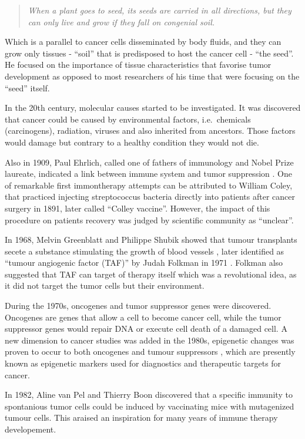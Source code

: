 \documentclass[12pt,]{book}
\theoremstyle{definition}
\theoremstyle{definition}
\theoremstyle{definition}
\theoremstyle{remark}
\begin{document}
\begin{quote}
\emph{When a plant goes to seed, its seeds are carried in all
directions, but they can only live and grow if they fall on congenial
soil.}
\end{quote}

Which is a parallel to cancer cells disseminated by body fluids, and
they can grow only tissues - ``soil'' that is predisposed to host the
cancer cell - ``the seed''. He focused on the importance of tissue
characteristics that favorise tumor development as opposed to most
researchers of his time that were focusing on the ``seed'' itself.

In the 20th century, molecular causes started to be investigated. It was
discovered that cancer could be caused by environmental factors,
i.e.~chemicals (carcinogens), radiation, viruses and also inherited from
ancestors. Those factors would damage but contrary to a healthy
condition they would not die.

Also in 1909, Paul Ehrlich, called one of fathers of immunology and
Nobel Prize laureate, indicated a link between immune system and tumor
suppression \citep{Ehrlich1909}. One of remarkable first immontherapy
attempts can be attributed to William Coley, that practiced injecting
streptococcus bacteria directly into patients after cancer surgery in
1891, later called ``Colley vaccine''. However, the impact of this
procedure on patients recovery was judged by scientific community as
``unclear''.

In 1968, Melvin Greenblatt and Philippe Shubik showed that tumour
transplants secete a substance stimulating the growth of blood vessels
\citep{Greenblatt1968}, later identified as ``tumour angiogenic factor
(TAF)'' by Judah Folkman in 1971 \citep{Folkman1971}. Folkman also
suggested that TAF can target of therapy itself which was a revolutional
idea, as it did not target the tumor cells but their environment.

During the 1970s, oncogenes and tumor suppressor genes were discovered.
Oncogenes are genes that allow a cell to become cancer cell, while the
tumor suppressor genes would repair DNA or execute cell death of a
damaged cell. A new dimension to cancer studies was added in the 1980s,
epigenetic changes was proven to occur to both oncogenes and tumour
suppressors \citep{Feinberg1983, Greger1989}, which are presently known
as epigenetic markers used for diagnostics and therapeutic targets for
cancer.

In 1982, Aline van Pel and Thierry Boon \citep{VanPel1982} discovered
that a specific immunity to spontanious tumor cells could be induced by
vaccinating mice with mutagenized tumour cells. This araised an
inspiration for many years of immune therapy developement.
\end{document}
